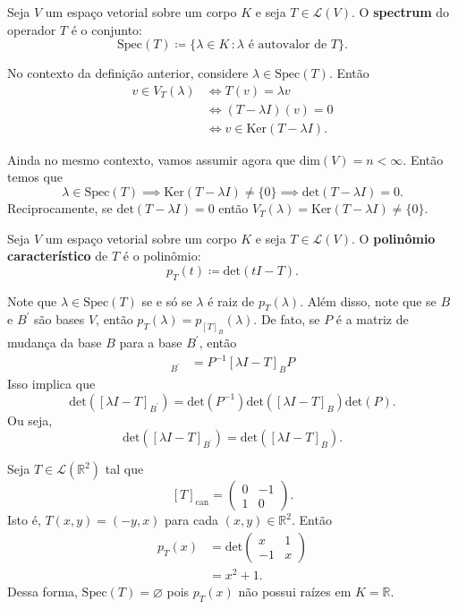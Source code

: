 \documentclass[11pt,twoside,a4paper]{book}
\begin{document}
\begin{definicao}
Seja \(V\) um espaço vetorial sobre um corpo \(K\) e seja \(T\in\mathcal{L}(V)\). O \textbf{spectrum} do operador \(T\) é o conjunto:
\[\text{Spec}(T)\coloneqq\{\lambda\in K\,\colon \lambda \text{ é autovalor de } T\}.\]
\end{definicao}

\noindent
No contexto da definição anterior, considere
\(\lambda\in\text{Spec}(T)\). Então
\begin{align*}
v\in V_T(\lambda)&\iff T(v)=\lambda v\\&\iff (T-\lambda I)(v)=0\\&\iff v\in\text{Ker}(T-\lambda I).
\end{align*}

\noindent
Ainda no mesmo contexto, vamos assumir agora que \(\text{dim}(V)=n<\infty\). Então temos 
que \[\lambda\in\text{Spec}(T)\implies\text{Ker}(T-\lambda I)\not =\{0\}\implies\text{det}(T-\lambda I)=0.\]
Reciprocamente, se \(\text{det}(T-\lambda I)=0\) então \(V_T(\lambda)=\text{Ker}(T-\lambda I)\not=\{0\}\).
\begin{definicao}
Seja \(V\) um espaço vetorial sobre um corpo \(K\) e seja \(T\in\mathcal{L}(V)\). O \textbf{polinômio característico} de \(T\) é o polinômio:
\[p_T(t)\coloneqq\text{det}(tI-T).\]
\end{definicao}

\noindent
Note que \(\lambda\in\text{Spec}(T)\) se e só se \(\lambda\) é raiz de \(p_T(\lambda)\). Além disso, note que se  \(B\) e \(B^\prime\) são bases \(V\), então \(p_T(\lambda)=p_{[T]_B}(\lambda)\). De fato, se \(P\) é a matriz de mudança da base \(B\) para a base \(B^\prime\), então
\begin{align*}
[\lambda I - T]_{B^\prime}&=P^{-1}[\lambda I - T]_{B}P
\end{align*}
Isso implica que \[\text{det}([\lambda I- T]_{B^\prime})=\text{det}(P^{-1})\text{det}([\lambda I - T]_B)\text{det}(P).\]
Ou seja,
\[\text{det}([\lambda I- T]_{B^\prime})=\text{det}([\lambda I - T]_B).\]
\begin{exemplo}
Seja \(T\in\mathcal{L}(\mathbb{R}^2)\) tal que \[[T]_{\text{can}}=\begin{pmatrix}
0 & -1\\1 & 0
\end{pmatrix}.\]
Isto é, \(T(x,y)=(-y,x)\) para cada \((x,y)\in\mathbb{R}^2\). Então 
\begin{align*}
p_T(x)&=\text{det}\begin{pmatrix}
x & 1\\-1 & x
\end{pmatrix}\\&=x^2+1.
\end{align*}
Dessa forma, \(\text{Spec}(T)=\varnothing\) pois \(p_T(x)\) não possui raízes em \(K=\mathbb{R}\).
\end{exemplo}
\end{document}
